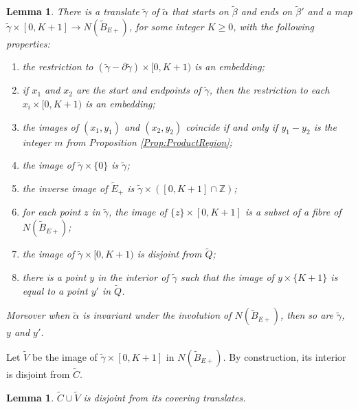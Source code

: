 \documentclass[oneside]{amsart}
\numberwithin{equation}{section}
\theoremstyle{plain}
\newtheorem{lemma}[equation]{Lemma}
\theoremstyle{definition}
\begin{document}
\begin{lemma}
There is a translate $\tilde \gamma$ of $\tilde \alpha$ that starts on $\tilde \beta$ and ends on $\tilde \beta'$
and a map $\tilde \gamma \times [0,K+1] \rightarrow N(\tilde B_{E+})$, for some integer $K \geq 0$, with the following properties:
\begin{enumerate}
\item the restriction to $(\tilde \gamma - \partial \tilde \gamma) \times [0,K+1)$ is an embedding;
\item if $x_1$ and $x_2$ are the start and endpoints of $\tilde \gamma$, then the restriction to each $x_i \times [0,K+1)$
is an embedding;
\item the images of $(x_1, y_1)$ and $(x_2, y_2)$ coincide if and only if $y_1 - y_2$ is the integer $m$ from 
Proposition \ref{Prop:ProductRegion};
\item the image of $\tilde \gamma \times \{ 0 \}$ is $\tilde \gamma$;
\item the inverse image of $\tilde E_+$ is $\tilde \gamma \times ([0,K+1] \cap \mathbb{Z})$;
\item for each point $z$ in $\tilde \gamma$, the image of $\{ z \} \times [0,K+1]$ is a subset of
a fibre of $N(\tilde B_{E+})$;
\item the image of  $\tilde \gamma \times [0,K+1)$ is disjoint from $\tilde Q$;
\item there is a point $y$ in the interior of $\tilde \gamma$ such that the image of $y \times \{ K+1 \}$
is equal to a point $y'$ in $\tilde Q$.
\end{enumerate}
Moreover when $\tilde \alpha$ is invariant under the involution of $N(\tilde B_{E+})$, then so
are $\tilde \gamma$, $y$ and $y'$.
\end{lemma}

Let $\tilde V$ be the image of $\tilde \gamma \times [0,K+1]$ in $N(\tilde B_{E+})$.
By construction, its interior is disjoint from $\tilde C$.

\begin{lemma}
\label{Lem:CCupVEmbedded}
$\tilde C \cup \tilde V$ is disjoint from its covering translates.
\end{lemma}
\end{document}
